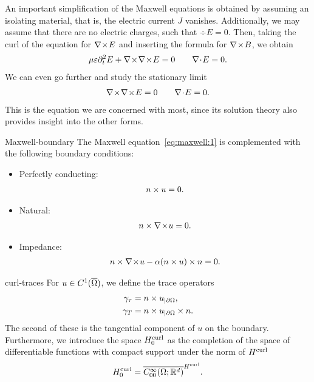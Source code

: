 \begin{intro}
  An important simplification of the Maxwell equations is obtained by
  assuming an isolating material, that is, the electric current $J$
  vanishes. Additionally, we may assume that there are no electric
  charges, such that $\div E=0$. Then, taking the curl of the equation
  for $\nabla\!\times\! E$ and inserting the formula for $\nabla\!\times\! B$, we obtain
  \begin{gather}
    \mu\varepsilon \partial_t^2 E + \nabla\!\times\!\nabla\!\times\! E = 0
    \qquad \nabla\!\cdot\! E=0.
  \end{gather}
  We can even go further and study the stationary limit
  \begin{gather}
    \label{eq:maxwell:1}
    \nabla\!\times\!\nabla\!\times\! E=0 \qquad \nabla\!\cdot\! E=0.
  \end{gather}
  This is the equation we are concerned with most, since its solution
  theory also provides insight into the other forms.
\end{intro}


\begin{Definition}{Maxwell-boundary}
  The Maxwell equation~\eqref{eq:maxwell:1} is complemented with the
  following boundary conditions:
  \begin{itemize}
  \item Perfectly conducting:
    \begin{gather}
      n\times u = 0.
    \end{gather}
    \item Natural:
      \begin{gather}
        n\times \nabla\!\times\! u = 0.
      \end{gather}
    \item Impedance:
      \begin{gather}
        n\times \nabla\!\times\! u - \alpha  (n\times u) \times n = 0.
      \end{gather}
  \end{itemize}
\end{Definition}


\begin{Definition}{curl-traces}
  For $u\in C^1(\overline{\Omega})$, we define the trace operators
  \begin{gather}
    \label{eq:maxwell:4}
    \begin{split}
      \gamma_{\tau} &= n\times u_{|\partial\Omega}, \\
      \gamma_{T} &= n\times u_{|\partial\Omega} \times n.\\
    \end{split}
  \end{gather}
  The second of these is the tangential component of $u$ on the
  boundary. Furthermore, we introduce the space $H^{\text{curl}}_0$ as the
  completion of the space of differentiable functions with compact
  support under the norm of $H^{\text{curl}}$
  \begin{gather}
    H^{\text{curl}}_0 = \overline{C^\infty_{00}(\Omega;\mathbb R^d)}^{H^{\text{curl}}}.
  \end{gather}
\end{Definition}


